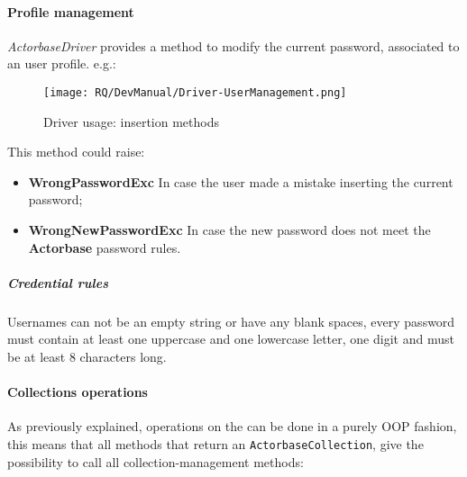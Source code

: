 \documentclass{scalatekids-article}
\begin{document}
\paragraph{Profile management}

\textit{ActorbaseDriver} provides a method to modify the current password,
associated to an user profile.
e.g.:
\begin{figure}[H]
  \begin{center}
    \texttt{[image: RQ/DevManual/Driver-UserManagement.png]}
    \caption{Driver usage: insertion methods}
  \end{center}
\end{figure}
This method could raise:
\begin{itemize}
\item \textbf{WrongPasswordExc} In case the user made a mistake inserting the current password;
\item \textbf{WrongNewPasswordExc} In case the new password does not meet the \textbf{Actorbase} password rules.
\end{itemize}

\subparagraph{Credential rules}
Usernames can not be an empty string or have any blank spaces, every password must
contain at least one uppercase and one lowercase letter, one digit and must be at
least 8 characters long.

\paragraph{Collections operations}

As previously explained, operations on the  can be done in a purely
OOP fashion, this means that all methods that return an \verb=ActorbaseCollection=,
give the possibility to call all collection-management methods:
\end{document}

